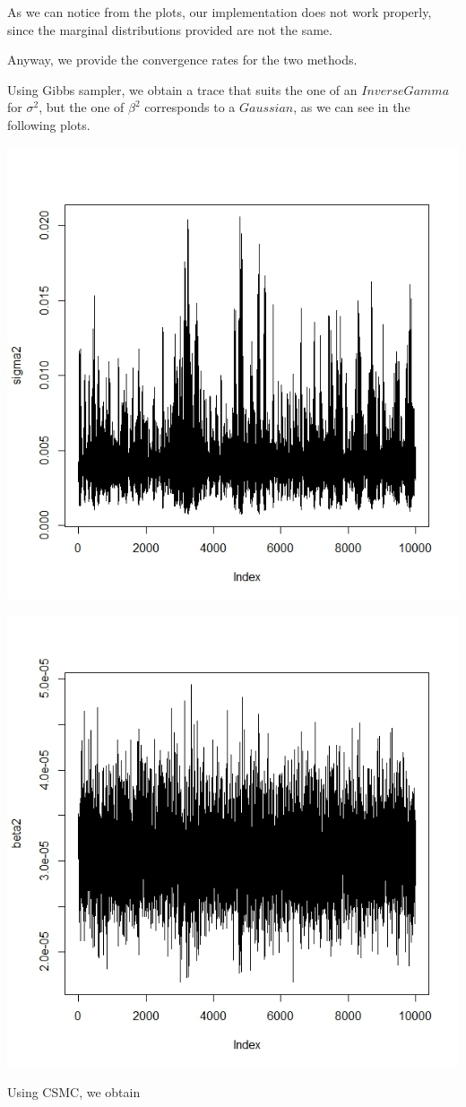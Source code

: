 \documentclass[]{article}
\begin{document}
	As we can notice from the plots, our implementation does not work properly, since the marginal distributions provided are not the same. 
	
	
	Anyway, we provide the convergence rates for the two methods.
	
	
	Using Gibbs sampler, we obtain a trace that suits the one of an $Inverse Gamma$ for $\sigma^2$, but the one of $\beta^2$ corresponds to a $Gaussian$, as we can see in the following plots.
	
	\begin{center}
		
		\includegraphics[width=.4\textwidth]{task5/Gibbs_sigma2_convergence.jpeg}
		
		\includegraphics[width=.4\textwidth]{task5/Gibbs_beta2_convergence.jpeg}
		
	\end{center}
	
	
	Using CSMC, we obtain
	
\end{document}
